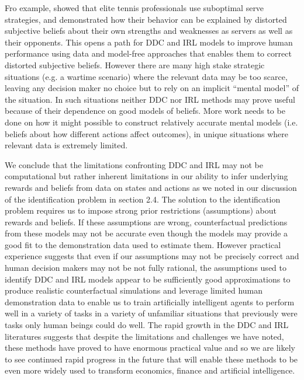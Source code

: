 Fro example, \citet{tennis:2025} showed that elite tennis professionals use suboptimal serve strategies,
and demonstrated how their behavior can be explained by distorted subjective beliefs 
about their own strengths and weaknesses as servers as well as their opponents. 
This opens a path for DDC and IRL models to improve human performance using data and
model-free approaches that enables them to correct distorted subjective beliefs. However
there are many high stake strategic situations (e.g. a wartime scenario)  where the
relevant data may be too scarce, leaving any decision maker no choice but to rely on an implicit
``mental model'' of the situation.  In such situations neither DDC nor IRL methods may
prove useful because of their dependence on good models of beliefs. More work needs to be 
done on how it might possible to construct relatively
accurate mental models (i.e. beliefs about how different actions affect outcomes), 
in unique situations where relevant data is extremely limited.



We conclude that the limitations confronting DDC and IRL may not be computational
but rather inherent limitations in our ability to infer underlying rewards and beliefs 
from data on states and actions as we noted in our discussion of the identification problem in 
section 2.4. The solution to the identification problem requires us to impose  strong 
prior restrictions (assumptions) about rewards and
beliefs. If these assumptions are wrong, counterfactual predictions from these
models may not be accurate even though the models may provide a good fit to the demonstration data
used to estimate them. However practical experience suggests that even if our assumptions
may not be precisely correct and human decision makers may not be not fully rational,
the assumptions used to identify DDC and IRL models appear to be sufficiently good approximations to 
produce realistic counterfactual simulations and leverage limited human demonstration data to enable us to train 
artificially intelligent agents to perform well in a variety of tasks in a variety
of unfamiliar situations that previously were tasks only human beings could do well.
The rapid growth in the DDC and IRL literatures suggests that despite the limitations
and challenges we have noted, these methods have proved to have enormous practical value
and so we are likely to see continued rapid progress  in the future that will enable these methods  
to be even more widely used to transform economics, finance and  artificial intelligence.





